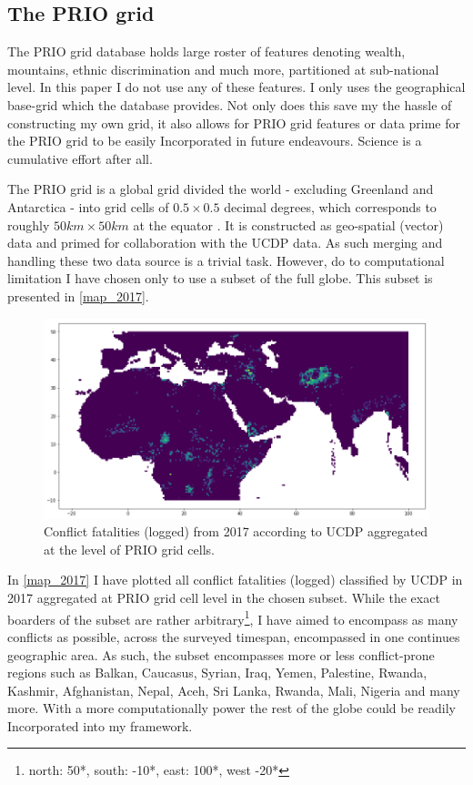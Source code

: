 \documentclass[a4paper]{article}
\begin{document}
\subsection{The PRIO grid}

The PRIO grid database holds large roster of features denoting wealth, mountains, ethnic discrimination and much more, partitioned at sub-national level. In this paper I do not use any of these features. I only uses the geographical base-grid which the database provides. Not only does this save my the hassle of constructing my own grid, it also allows for PRIO grid features or data prime for the PRIO grid to be easily Incorporated in future endeavours. Science is a cumulative effort after all.\par 

The PRIO grid is a global grid divided the world - excluding Greenland and Antarctica - into grid cells of $0.5 \times 0.5$ decimal degrees, which corresponds to roughly $50km\times50km$ at the equator \citep[367]{Tollefsen_2012}. It is constructed as geo-spatial (vector) data and primed for collaboration with the UCDP data. As such merging and handling these two data source is a trivial task. However, do to computational limitation I have chosen only to use a subset of the full globe. This subset is presented in \autoref{map_2017}.\par

\begin{figure}[!htb]
	\centering
	\includegraphics[scale=0.5]{map_2017.png}
    \caption{\footnotesize{Conflict fatalities (logged) from 2017 according to UCDP aggregated at the level of PRIO grid cells.}}\label{map_2017}
\end{figure}

In \autoref{map_2017} I have plotted all conflict fatalities (logged) classified by UCDP in 2017 aggregated at PRIO grid cell level in the chosen subset. While the exact boarders of the subset are rather arbitrary\footnote{north: 50*, south: -10*, east: 100*, west -20*}, I have aimed to encompass as many conflicts as possible, across the surveyed timespan, encompassed in one continues geographic area. As such, the subset encompasses more or less conflict-prone regions such as Balkan, Caucasus, Syrian, Iraq, Yemen, Palestine, Rwanda, Kashmir, Afghanistan, Nepal, Aceh, Sri Lanka, Rwanda, Mali, Nigeria and many more. With a more computationally power the rest of the globe could be readily Incorporated into my framework.\par
\end{document}
